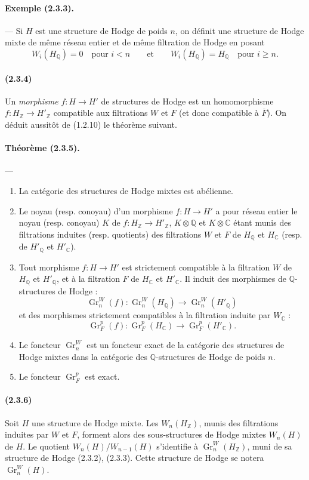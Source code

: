 \documentclass[10pt]{article}
\newcommand{\C}{\mathbb C}
\newcommand{\Q}{\mathbb Q}
\newcommand{\Z}{\mathbb Z}
\newcommand{\Gr}{\operatorname{Gr}}
\begin{document}
\paragraph{Exemple (2.3.3).} --- Si $H$ est une structure de Hodge de poids $n$, on définit une structure de Hodge mixte de même réseau entier et de même filtration de Hodge en posant
\[
W_i(H_\Q)=0\quad\text{pour } i<n\qquad\text{et}\qquad
W_i(H_\Q)=H_\Q\quad\text{pour } i\ge n.
\]

\paragraph{(2.3.4)} Un \emph{morphisme} $f:H\to H'$ de structures de Hodge est un homomorphisme $f:H_\Z\to H'_\Z$ compatible aux filtrations $W$ et $F$ (et donc compatible à $\overline F$). On déduit aussitôt de (1.2.10) le théorème suivant.

\paragraph{Théorème (2.3.5).} --- {\itshape
\begin{enumerate}[label=(\roman*)]
\item La catégorie des structures de Hodge mixtes est abélienne.
\item Le noyau (resp. conoyau) d'un morphisme $f:H\to H'$ a pour réseau entier le noyau (resp. conoyau) $K$ de $f:H_\Z\to H'_\Z$, $K\otimes\Q$ et $K\otimes\C$ étant munis des filtrations induites (resp. quotients) des filtrations $W$ et $F$ de $H_\Q$ et $H_\C$ (resp. de $H'_\Q$ et $H'_\C$).
\item Tout morphisme $f:H\to H'$ est strictement compatible à la filtration $W$ de $H_\Q$ et $H'_\Q$, et à la filtration $F$ de $H_\C$ et $H'_\C$. Il induit des morphismes de $\Q$-structures de Hodge :
\[
\Gr_n^W(f):\Gr_n^W(H_\Q)\longrightarrow\Gr_n^W(H'_\Q)
\]
et des morphismes strictement compatibles à la filtration induite par $W_\C$ :
\[
\Gr_F^p(f):\Gr_F^p(H_\C)\longrightarrow\Gr_F^p(H'_\C).
\]
\item Le foncteur $\Gr_n^W$ est un foncteur exact de la catégorie des structures de Hodge mixtes dans la catégorie des $\Q$-structures de Hodge de poids $n$.
\item Le foncteur $\Gr_F^p$ est exact.
\end{enumerate}}

\paragraph{(2.3.6)} Soit $H$ une structure de Hodge mixte. Les $W_n(H_\Z)$, munis des filtrations induites par $W$ et $F$, forment alors des sous-structures de Hodge mixtes $W_n(H)$ de $H$. Le quotient $W_n(H)/W_{n-1}(H)$ s'identifie à $\Gr_n^W(H_\Z)$, muni de sa structure de Hodge (2.3.2), (2.3.3). Cette structure de Hodge se notera $\Gr_n^W(H)$.
\end{document}
